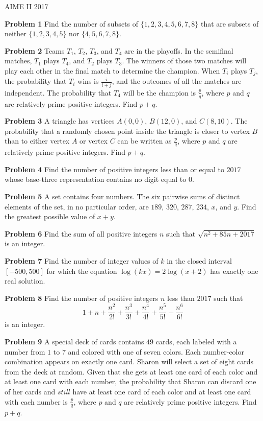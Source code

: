 \documentclass[a4paper,11pt]{article}
\begin{document}
\begin{center}
\begin{LARGE}
AIME II 2017
\end{LARGE}
\end{center}

\textbf{Problem 1}
Find the number of subsets of $\{1, 2, 3, 4, 5, 6, 7, 8\}$ that are subsets of neither $\{1, 2, 3, 4, 5\}$ nor $\{4, 5, 6, 7, 8\}$.

\textbf{Problem 2}
Teams $T_1$, $T_2$, $T_3$, and $T_4$ are in the playoffs. In the semifinal matches, $T_1$ plays $T_4$, and $T_2$ plays $T_3$. The winners of those two matches will play each other in the final match to determine the champion. When $T_i$ plays $T_j$, the probability that $T_i$ wins is $\frac{i}{i+j}$, and the outcomes of all the matches are independent. The probability that $T_4$ will be the champion is $\frac{p}{q}$, where $p$ and $q$ are relatively prime positive integers. Find $p+q$.

\textbf{Problem 3}
A triangle has vertices $A(0,0)$, $B(12,0)$, and $C(8,10)$. The probability that a randomly chosen point inside the triangle is closer to vertex $B$ than to either vertex $A$ or vertex $C$ can be written as $\frac{p}{q}$, where $p$ and $q$ are relatively prime positive integers. Find $p+q$.

\textbf{Problem 4}
Find the number of positive integers less than or equal to $2017$ whose base-three representation contains no digit equal to $0$.

\textbf{Problem 5}
A set contains four numbers. The six pairwise sums of distinct elements of the set, in no particular order, are $189$, $320$, $287$, $234$, $x$, and $y$. Find the greatest possible value of $x+y$.

\textbf{Problem 6}
Find the sum of all positive integers $n$ such that $\sqrt{n^2+85n+2017}$ is an integer.

\textbf{Problem 7}
Find the number of integer values of $k$ in the closed interval $[-500,500]$ for which the equation $\log(kx)=2\log(x+2)$ has exactly one real solution.

\textbf{Problem 8}
Find the number of positive integers $n$ less than $2017$ such that \[1+n+\frac{n^2}{2!}+\frac{n^3}{3!}+\frac{n^4}{4!}+\frac{n^5}{5!}+\frac{n^6}{6!}\] is an integer.

\textbf{Problem 9}
A special deck of cards contains $49$ cards, each labeled with a number from $1$ to $7$ and colored with one of seven colors. Each number-color combination appears on exactly one card. Sharon will select a set of eight cards from the deck at random. Given that she gets at least one card of each color and at least one card with each number, the probability that Sharon can discard one of her cards and $\textit{still}$ have at least one card of each color and at least one card with each number is $\frac{p}{q}$, where $p$ and $q$ are relatively prime positive integers. Find $p+q$.
\end{document}
